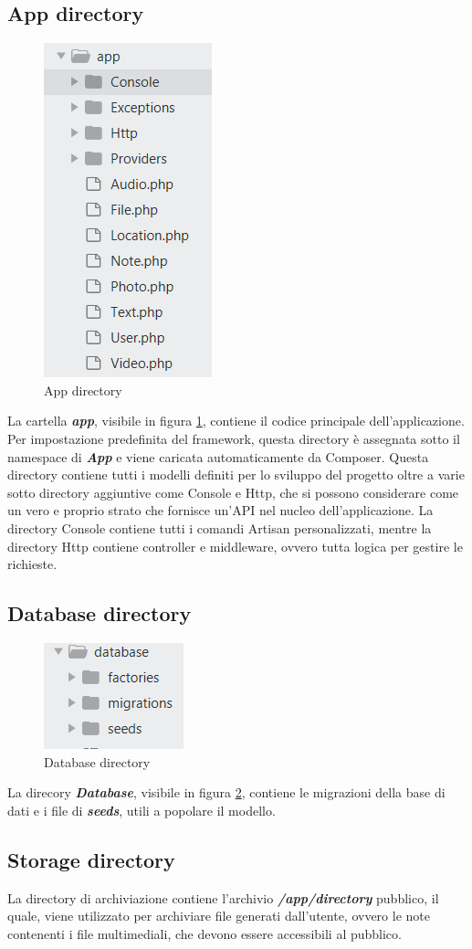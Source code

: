\subsection{App directory}
\begin{figure}[H]
	\centering
	\includegraphics[width=0.15\linewidth, height=0.2\textheight]{AppDirectory}
	\caption{App directory}
	\label{fig:AppDirectory}
\end{figure}
La cartella \textit{\textbf{app}}, visibile in figura \ref{fig:AppDirectory}, contiene il codice principale dell'applicazione. Per impostazione predefinita del framework, questa directory è assegnata sotto il namespace di \textit{\textbf{App}} e viene caricata automaticamente da Composer.
Questa directory contiene tutti i modelli definiti per lo sviluppo del progetto oltre a varie sotto directory aggiuntive come Console e Http, che si possono considerare come un vero e proprio strato che fornisce un'API nel nucleo dell'applicazione.
La directory Console contiene tutti i comandi Artisan personalizzati, mentre la directory Http contiene controller e middleware, ovvero tutta logica per gestire le richieste.

\subsection{Database directory}
\begin{figure}[H]
	\centering
	\includegraphics[width=0.2\linewidth, height=0.1\textheight]{DatabaseDirectory}
	\caption{Database directory}
	\label{fig:DBDirectory}
\end{figure}

La direcory \textit{\textbf{Database}}, visibile in figura \ref{fig:DBDirectory}, contiene le migrazioni della base di dati e i file di \textit{\textbf{seeds}}, utili a popolare il modello.

\subsection{Storage directory}
La directory di archiviazione contiene l'archivio \textit{\textbf{/app/directory}} pubblico, il quale, viene utilizzato per archiviare file generati dall'utente, ovvero le note contenenti i file multimediali, che devono essere accessibili al pubblico. 
\vspace{-9px}
